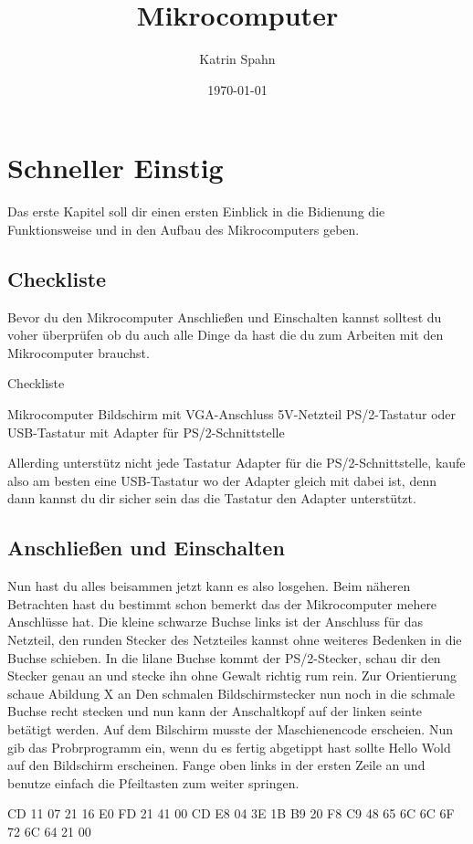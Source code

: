 \documentclass[10pt]{book}
\title{Mikrocomputer}
\author{Katrin Spahn}
\date{\today}
\begin{document}
\maketitle

\chapter{Schneller Einstig}

Das erste Kapitel soll dir einen ersten Einblick in die Bidienung die Funktionsweise und in den Aufbau des Mikrocomputers geben.

\section{Checkliste}
Bevor du den Mikrocomputer Anschließen und Einschalten kannst solltest
du voher überprüfen ob du auch alle Dinge da hast die du zum Arbeiten mit den Mikrocomputer brauchst.

Checkliste

Mikrocomputer
Bildschirm mit VGA-Anschluss
5V-Netzteil
PS/2-Tastatur oder USB-Tastatur
mit Adapter für PS/2-Schnittstelle

Allerding unterstütz nicht jede Tastatur Adapter für die PS/2-Schnittstelle,
kaufe also am besten eine USB-Tastatur wo der Adapter gleich mit dabei ist,
denn dann kannst du dir sicher sein das die Tastatur den Adapter unterstützt.
\section{Anschließen und Einschalten}

Nun hast du alles beisammen jetzt kann es also losgehen.
Beim näheren Betrachten hast du bestimmt schon bemerkt das der Mikrocomputer
mehere Anschlüsse hat. Die kleine schwarze Buchse links ist der Anschluss für das Netzteil, den runden Stecker des Netzteiles kannst ohne weiteres Bedenken in die Buchse schieben. In die lilane Buchse kommt der PS/2-Stecker, schau dir den Stecker  genau an und stecke ihn ohne Gewalt richtig rum rein. Zur Orientierung schaue Abildung X an
Den schmalen Bildschirmstecker nun noch in die schmale Buchse recht stecken und nun kann der Anschaltkopf auf der linken seinte betätigt werden. Auf dem Bilschirm musste der Maschienencode erscheien.
Nun gib das Probrprogramm ein, wenn du es fertig abgetippt hast sollte Hello Wold auf den Bildschirm erscheinen. Fange oben links in der ersten Zeile an und benutze einfach die Pfeiltasten zum weiter springen.

CD 11 07 21 16 E0 FD 21 41 00 CD E8 04 3E 1B B9 20 F8 C9 48 65 6C 6C 6F 72 6C 64 21 00
\end{document}
